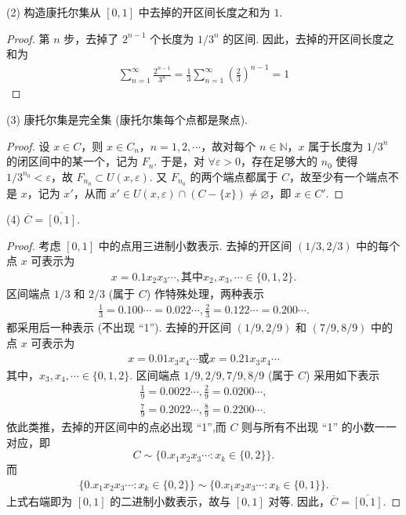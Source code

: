\documentclass[../../main.tex]{subfiles}
\begin{document}
(2) 构造康托尔集从 $[0,1]$ 中去掉的开区间长度之和为 $1$.
\begin{proof}
第 $n$ 步，去掉了 $2^{n - 1}$ 个长度为 $1/3^n$ 的区间. 因此，去掉的开区间长度之和为
\begin{align*}
\sum_{n = 1}^{\infty}\frac{2^{n - 1}}{3^n}=\frac{1}{3}\sum_{n = 1}^{\infty}\left(\frac{2}{3}\right)^{n - 1}=1
\end{align*}
\end{proof}

(3) 康托尔集是完全集 (康托尔集每个点都是聚点).
\begin{proof}
设 $x\in C$，则 $x\in C_n$，$n = 1,2,\cdots$，故对每个 $n\in\mathbb{N}$，$x$ 属于长度为 $1/3^n$ 的闭区间中的某一个，记为 $F_n$. 于是，对 $\forall\varepsilon>0$，存在足够大的 $n_0$ 使得 $1/3^{n_0}<\varepsilon$，故 $F_{n_0}\subset U(x,\varepsilon)$. 又 $F_{n_0}$ 的两个端点都属于 $C$，故至少有一个端点不是 $x$，记为 $x'$，从而 $x'\in U(x,\varepsilon)\cap (C - \{x\})\neq\varnothing$，即 $x\in C'$. 
\end{proof}

(4) $\overline{C} = \overline{[0,1]}$.
\begin{proof}
考虑 $[0,1]$ 中的点用三进制小数表示. 去掉的开区间 $(1/3,2/3)$ 中的每个点 $x$ 可表示为
\begin{gather*}
x = 0.1x_2x_3\cdots,\text{其中}x_2,x_3,\cdots\in\{0,1,2\}.
\end{gather*}
区间端点 $1/3$ 和 $2/3$ (属于 $C$) 作特殊处理，两种表示
\begin{gather*}
\frac{1}{3}=0.100\cdots = 0.022\cdots,\frac{2}{3}=0.122\cdots = 0.200\cdots.
\end{gather*}
都采用后一种表示 (不出现 “1”). 去掉的开区间 $(1/9,2/9)$ 和 $(7/9,8/9)$ 中的点 $x$ 可表示为
\begin{gather*}
x = 0.01x_3x_4\cdots \text{或} x = 0.21x_3x_4\cdots
\end{gather*}
其中，$x_3,x_4,\cdots\in\{0,1,2\}$. 区间端点 $1/9,2/9,7/9,8/9$ (属于 $C$) 采用如下表示
\begin{gather*}
\frac{1}{9}=0.0022\cdots,\frac{2}{9}=0.0200\cdots,
\\
\frac{7}{9}=0.2022\cdots,\frac{8}{9}=0.2200\cdots.   
\end{gather*}
依此类推，去掉的开区间中的点必出现 “1”,而 $C$ 则与所有不出现 “1” 的小数一一对应，即
\[C\sim\{0.x_1x_2x_3\cdots:x_k\in\{0,2\}\}.\]
而
\begin{gather*}
\{0.x_1x_2x_3\cdots:x_k\in\{0,2\}\}\sim\{0.x_1x_2x_3\cdots:x_k\in\{0,1\}\}.
\end{gather*}
上式右端即为 $[0,1]$ 的二进制小数表示，故与 $[0,1]$ 对等. 因此，$\overline{C} = \overline{[0,1]}$.
\end{proof}
\end{document}
